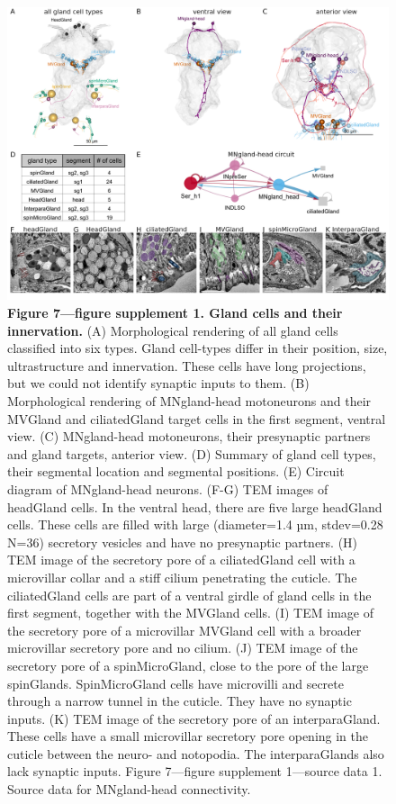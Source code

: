 \documentclass[
  11pt,
]{article}
\begin{document}
\begin{figure}[H]

{\centering \includegraphics[width=1\textwidth,height=\textheight]{Figures/Figure7_fig_suppl1.png}

}

\caption{\textbf{Figure 7---figure supplement 1. Gland cells and their
innervation.} (A) Morphological rendering of all gland cells classified
into six types. Gland cell-types differ in their position, size,
ultrastructure and innervation. These cells have long projections, but
we could not identify synaptic inputs to them. (B) Morphological
rendering of MNgland-head motoneurons and their MVGland and
ciliatedGland target cells in the first segment, ventral view. (C)
MNgland-head motoneurons, their presynaptic partners and gland targets,
anterior view. (D) Summary of gland cell types, their segmental location
and segmental positions. (E) Circuit diagram of MNgland-head neurons.
(F-G) TEM images of headGland cells. In the ventral head, there are five
large headGland cells. These cells are filled with large (diameter=1.4
µm, stdev=0.28 N=36) secretory vesicles and have no presynaptic
partners. (H) TEM image of the secretory pore of a ciliatedGland cell
with a microvillar collar and a stiff cilium penetrating the cuticle.
The ciliatedGland cells are part of a ventral girdle of gland cells in
the first segment, together with the MVGland cells. (I) TEM image of the
secretory pore of a microvillar MVGland cell with a broader microvillar
secretory pore and no cilium. (J) TEM image of the secretory pore of a
spinMicroGland, close to the pore of the large spinGlands.
SpinMicroGland cells have microvilli and secrete through a narrow tunnel
in the cuticle. They have no synaptic inputs. (K) TEM image of the
secretory pore of an interparaGland. These cells have a small
microvillar secretory pore opening in the cuticle between the neuro- and
notopodia. The interparaGlands also lack synaptic inputs. Figure
7---figure supplement 1---source data 1. Source data for MNgland-head
connectivity.}

\end{figure}%
\end{document}
